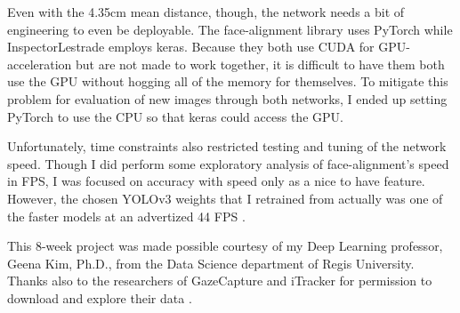 \documentclass[aip, rsi, amsmath, amssymb, reprint, author-year, longbibliography]{revtex4-1}
\begin{document}
Even with the 4.35cm mean distance, though, the network needs a bit of
engineering to even be deployable. The face-alignment library
\citep{bulat2017far} uses PyTorch while InspectorLestrade employs keras. Because
they both use CUDA for GPU-acceleration but are not made to work together, it is
difficult to have them both use the GPU without hogging all of the memory for
themselves. To mitigate this problem for evaluation of new images through both
networks, I ended up setting PyTorch to use the CPU so that keras could access
the GPU.

Unfortunately, time constraints also restricted testing and tuning of the
network speed. Though I did perform some exploratory analysis of
face-alignment's speed in FPS, I was focused on accuracy with speed only as a
nice to have feature. However, the chosen YOLOv3 weights that I retrained from
actually was one of the faster models at an advertized 44 FPS \citep{yolov3}.

\begin{acknowledgments}
  This 8-week project was made possible courtesy of my Deep Learning professor,
  Geena Kim, Ph.D., from the Data Science department of Regis University. Thanks
  also to the researchers of GazeCapture and iTracker for permission to download
  and explore their data \citep{7780608}.
\end{acknowledgments}


\nocite{*}

\end{document}
